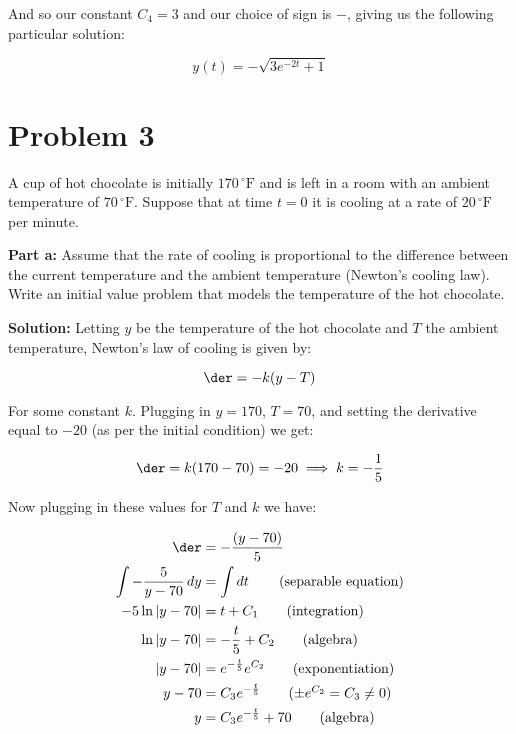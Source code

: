 \documentclass{article}
\begin{document}
And so our constant $C_4=3$ and our choice of sign is $-$, giving us the following particular solution:

\begin{equation*}
    y(t)=-\sqrt{3e^{-2t}+1}
\end{equation*}

\section*{Problem 3}
A cup of hot chocolate is initially $170\,{^\circ\text{F}}$ and is left in a room with an ambient temperature of $70\,{^\circ\text{F}}$. Suppose that at time $t=0$ it is cooling at a rate of $20\,{^\circ\text{F}}$ per minute.
\bigskip

\noindent\textbf{Part a:} Assume that the rate of cooling is proportional to the difference between the current temperature and the ambient temperature (Newton's cooling law). Write an initial value problem that models the temperature of the hot chocolate.
\bigskip

\noindent\textbf{Solution:} Letting $y$ be the temperature of the hot chocolate and $T$ the ambient temperature, Newton's law of cooling is given by:

\begin{equation*}
    \der=-k(y-T)
\end{equation*}

For some constant $k$. Plugging in $y=170$, $T=70$, and setting the derivative equal to $-20$ (as per the initial condition) we get:

\begin{equation*}
    \der=k(170-70)=-20\implies k=-\frac{1}{5}\\    
\end{equation*}
\smallskip

Now plugging in these values for $T$ and $k$ we have:

\begin{align*}
    \der&=-\frac{(y-70)}{5}\\
    \int-\frac{5}{y-70}\mathop{dy}&=\int\mathop{dt}\tag{separable equation}\\
    -5\ln|y-70|&=t+C_1\tag{integration}\\
    \ln|y-70|&=-\frac{t}{5}+C_2\tag{algebra}\\
    |y-70|&=e^{-\frac{t}{5}}e^{C_2}\tag{exponentiation}\\
    y-70&=C_3e^{-\frac{t}{5}}\tag{$\pm e^{C_2}=C_3\not=0$}\\
    y&=C_3e^{-\frac{t}{5}}+70\tag{algebra}
\end{align*}
\end{document}
